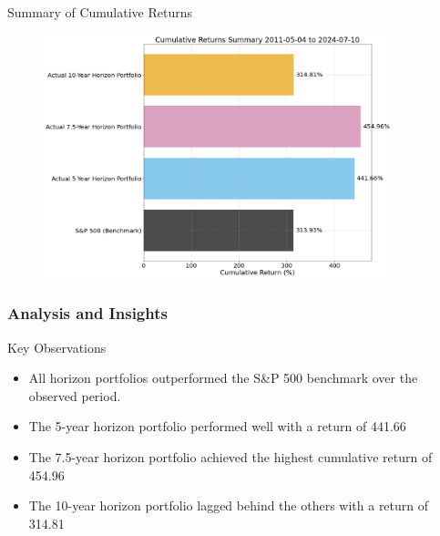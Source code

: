 \documentclass{beamer}
\begin{document}
\begin{frame}{Summary of Cumulative Returns}
    \begin{figure}
        \centering
        \includegraphics[width=0.9\textwidth]{cumulative_returns_summary.png}
    \end{figure}
\end{frame}

\begin{frame}
\frametitle{Analysis and Insights}
    \begin{block}{Key Observations}
        \begin{itemize}
            \item All horizon portfolios outperformed the S\&P 500 benchmark over the observed period.
            \item The 5-year horizon portfolio performed well with a return of 441.66%
            \item The 7.5-year horizon portfolio achieved the highest cumulative return of 454.96%
            \item The 10-year horizon portfolio lagged behind the others with a return of 314.81%
        \end{itemize}
    \end{block}
\end{frame}
\end{document}
